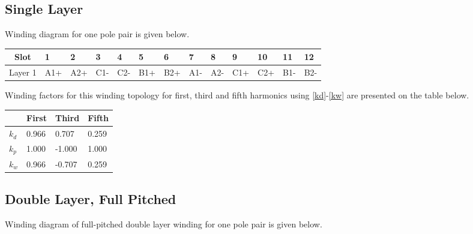 \documentclass{reportClass}
\begin{document}
\newpage

\subsection{Single Layer}

Winding diagram for one pole pair is given below.
 
\begin{table}[h!] \centering
\begin{tabular}{|c|l|l|l|l|l|l|l|l|l|l|l|l|}
\hline
Slot & 1                           & 2                           & 3                           & 4                           & 5                           & 6                           & 7                           & 8                           & 9                           & 10                          & 11                          & 12                          \\ \hline
Layer 1 & \cellcolor[HTML]{FCFF2F}A1+ & \cellcolor[HTML]{FCFF2F}A2+ & \cellcolor[HTML]{CBCEFB}C1- & \cellcolor[HTML]{CBCEFB}C2- & \cellcolor[HTML]{90E3FB}B1+ & \cellcolor[HTML]{90E3FB}B2+ & \cellcolor[HTML]{FFFE65}A1- & \cellcolor[HTML]{FFFE65}A2- & \cellcolor[HTML]{CBCEFB}C1+ & \cellcolor[HTML]{CBCEFB}C2+ & \cellcolor[HTML]{90E3FB}B1- & \cellcolor[HTML]{90E3FB}B2- \\ \hline
\end{tabular}

\end{table}

Winding factors for this winding topology for first, third and fifth harmonics using \ref{kd}-\ref{kw} are presented on the table below.

\begin{table}[h!] \centering
\begin{tabular}{|l|l|l|l|}
\hline
   & First & Third  & Fifth \\ \hline
$k_d$ & 0.966 & 0.707  & 0.259 \\ \hline
$k_p$ & 1.000 & -1.000 & 1.000 \\ \hline
$k_w$ & 0.966 & -0.707 & 0.259 \\ \hline
\end{tabular}
\end{table}

\subsection{Double Layer, Full Pitched}

Winding diagram of full-pitched double layer winding for one pole pair is given below.
 
\end{document}
